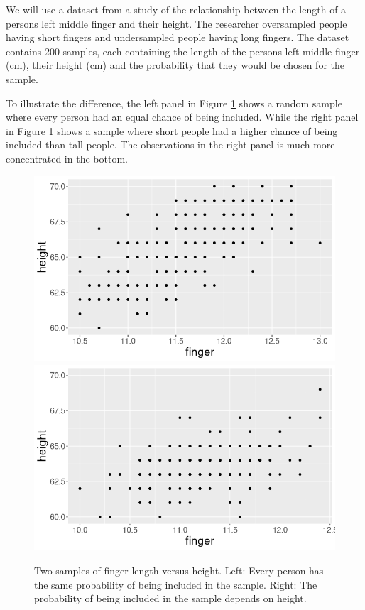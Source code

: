 \documentclass{article}
\begin{document}
\begin{example}

We will use a dataset from a study of the relationship between the length of a persons left middle finger and their height. 
The researcher oversampled people having short fingers and undersampled people
having long fingers.
The dataset contains 200 samples, each containing the length of the persons left middle finger (cm), their height (cm) and the probability that they would be chosen for the sample.

To illustrate the difference, the left panel in Figure \ref{fig:anthSamples} shows a random sample where every
person had an equal chance of being included. While the right panel in Figure \ref{fig:anthSamples} shows a sample
where short people had a higher chance of being included than tall people. The
observations in the right panel is much more concentrated in the bottom.

\begin{figure}
  \label{fig:anthSamples}
  \includegraphics[scale = 0.4]{example1_SRS.png}
  \includegraphics[scale = 0.4]{example1_UNEQ.png}
  \caption{Two samples of finger length versus height. Left: Every person has the same
    probability of being included in the sample. Right: The probability of being
  included in the sample depends on height.}
\end{figure}



\end{example}
\end{document}
